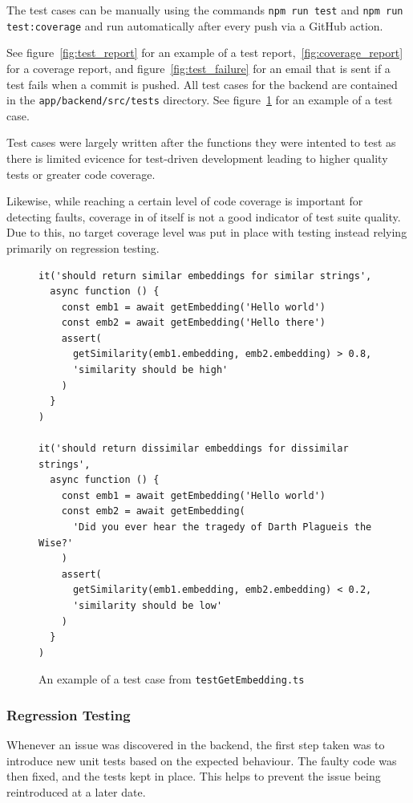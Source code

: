 The test cases can be manually using the commands \texttt{npm run test} and \texttt{npm run test:coverage}
and run automatically after every push via a GitHub action.

See figure~\ref{fig:test_report} for an example of a test report,~\ref{fig:coverage_report}
for a coverage report, and figure~\ref{fig:test_failure} for an email that is sent if a test fails when a commit
is pushed. All test cases for the backend are contained in the \texttt{app/backend/src/tests} directory. See
figure~\ref{fig:test_case} for an example of a test case.

Test cases were largely written after the functions they were intented to test
as there is limited evicence for test-driven development leading to higher
quality tests or greater code coverage.~\cite{tosun_effectiveness_2018,madeyski_impact_2010}

Likewise, while reaching a certain level of code coverage is important for detecting
faults, coverage in of itself is not a good indicator of test suite quality.~\cite{meyer_is_2012}
Due to this, no target coverage level was put in place with testing instead
relying primarily on regression testing.

\begin{figure}[p]
    \caption{\label{fig:test_case}An example of a test case from \texttt{testGetEmbedding.ts}}
    \begin{verbatim}
it('should return similar embeddings for similar strings',
  async function () {
    const emb1 = await getEmbedding('Hello world')
    const emb2 = await getEmbedding('Hello there')
    assert(
      getSimilarity(emb1.embedding, emb2.embedding) > 0.8,
      'similarity should be high'
    )
  }
)

it('should return dissimilar embeddings for dissimilar strings',
  async function () {
    const emb1 = await getEmbedding('Hello world')
    const emb2 = await getEmbedding(
      'Did you ever hear the tragedy of Darth Plagueis the Wise?'
    )
    assert(
      getSimilarity(emb1.embedding, emb2.embedding) < 0.2,
      'similarity should be low'
    )
  }
)
    \end{verbatim}
\end{figure}

\subsubsection{Regression Testing}

Whenever an issue was discovered in the backend, the first step taken was to
introduce new unit tests based on the expected behaviour. The faulty code was
then fixed, and the tests kept in place. This helps to prevent the issue being
reintroduced at a later date.


